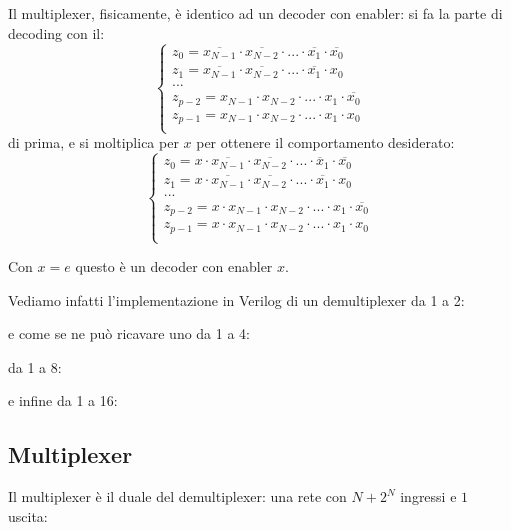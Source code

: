 \documentclass[a4paper,11pt]{article}
\begin{document}
Il multiplexer, fisicamente, è identico ad un decoder con enabler: si fa la parte di decoding con il:
\[
	\begin{cases}
		z_0 = \overline{x_{N-1}} \cdot \overline{x_{N-2}} \cdot ... \cdot \overline{x_1} \cdot \overline{x_0}	\\
		z_1 = \overline{x_{N-1}} \cdot \overline{x_{N-2}} \cdot ... \cdot \overline{x_1} \cdot x_0	\\
		... \\ 
		z_{p-2} = x_{N-1} \cdot x_{N-2} \cdot ... \cdot x_1 \cdot \overline{x_0}	\\
		z_{p-1} = x_{N-1} \cdot x_{N-2} \cdot ... \cdot x_1 \cdot x_0	\\
	\end{cases}
\]
di prima, e si moltiplica per $x$ per ottenere il comportamento desiderato:
\[
	\begin{cases}
		z_0 = x \cdot \overline{x_{N-1}} \cdot \overline{x_{N-2}} \cdot ... \cdot \overline{x}_1 \cdot \overline{x_0}	\\
		z_1 = x \cdot \overline{x_{N-1}} \cdot \overline{x_{N-2}} \cdot ... \cdot \overline{x_1} \cdot x_0	\\
		... \\ 
		z_{p-2} = x \cdot x_{N-1} \cdot x_{N-2} \cdot ... \cdot x_1 \cdot \overline{x_0}	\\
		z_{p-1} = x \cdot x_{N-1} \cdot x_{N-2} \cdot ... \cdot x_1 \cdot x_0	\\
	\end{cases}
\]

Con $x = e$ questo è un decoder con enabler $x$.

Vediamo infatti l'implementazione in Verilog di un demultiplexer da 1 a 2:



e come se ne può ricavare uno da 1 a 4:



da 1 a 8:



e infine da 1 a 16:



\subsection{Multiplexer}
Il multiplexer è il duale del demultiplexer: una rete con $N + 2^N$ ingressi e $1$ uscita:
\end{document}
